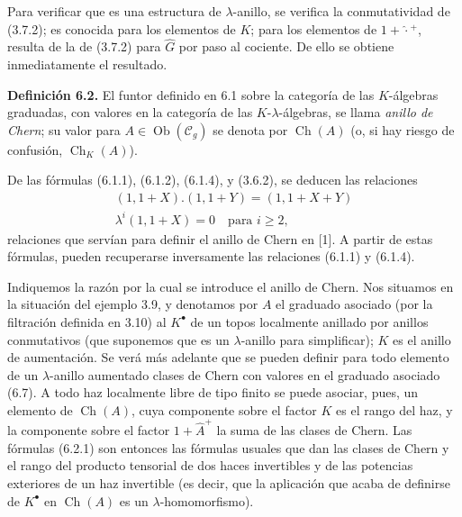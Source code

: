 Para verificar que es una estructura de \(\lambda\)-anillo, se verifica la conmutatividad de (3.7.2); es conocida para los elementos de \(K\); para los elementos de \(1+\widehat{\cdot}{}^{+}\), resulta de la de (3.7.2) para \(\widehat G\) por paso al cociente. De ello se obtiene inmediatamente el resultado.



\providecommand{\Ghat}{\widehat G}
\providecommand{\Aqhat}{\widehat A_{\mathbb Q}}
\providecommand{\Ch}{\operatorname{Ch}}
\providecommand{\Log}{\operatorname{Log}}
\providecommand{\id}{\operatorname{id}}
\providecommand{\gr}{\operatorname{gr}}
\providecommand{\Hom}{\operatorname{Hom}}
\providecommand{\epsi}{\varepsilon}
\providecommand{\clgr}{\operatorname{cl}}
\providecommand{\Fil}{\operatorname{Fil}}
\providecommand{\Gr}{\operatorname{Gr}}
\providecommand{\Sym}{\operatorname{Sym}}


\textbf{Definición 6.2.} El funtor definido en 6.1 sobre la categoría de las \(K\)-álgebras graduadas, con valores en la categoría de las \(K\)-\(\lambda\)-álgebras, se llama \emph{anillo de Chern}; su valor para \(A\in\operatorname{Ob}(\mathcal C_g)\) se denota por \(\Ch(A)\) (o, si hay riesgo de confusión, \(\Ch_K(A)\)).

De las fórmulas (6.1.1), (6.1.2), (6.1.4), y (3.6.2), se deducen las relaciones
\begin{equation}\tag{6.2.1}
\begin{gathered}
 (1,1+X).(1,1+Y)=(1,1+X+Y)\\
 \lambda^i(1,1+X)=0\quad\text{para }i\ge2,
\end{gathered}
\end{equation}
relaciones que servían para definir el anillo de Chern en [1]. A partir de estas fórmulas, pueden recuperarse inversamente las relaciones (6.1.1) y (6.1.4).

Indiquemos la razón por la cual se introduce el anillo de Chern. Nos situamos en la situación del ejemplo 3.9, y denotamos por \(A\) el graduado asociado (por la filtración definida en 3.10) al \(K^\bullet\) de un topos localmente anillado por anillos conmutativos (que suponemos que es un \(\lambda\)-anillo para simplificar); \(K\) es el anillo de aumentación. Se verá más adelante que se pueden definir para todo elemento de un \(\lambda\)-anillo aumentado clases de Chern con valores en el graduado asociado (6.7). A todo haz localmente libre de tipo finito se puede asociar, pues, un elemento de \(\Ch(A)\), cuya componente sobre el factor \(K\) es el rango del haz, y la componente sobre el factor \(1+\widehat A^+\) la suma de las clases de Chern. Las fórmulas (6.2.1) son entonces las fórmulas usuales que dan las clases de Chern y el rango del producto tensorial de dos haces invertibles y de las potencias exteriores de un haz invertible (es decir, que la aplicación que acaba de definirse de \(K^\bullet\) en \(\Ch(A)\) es un \(\lambda\)-homomorfismo).

